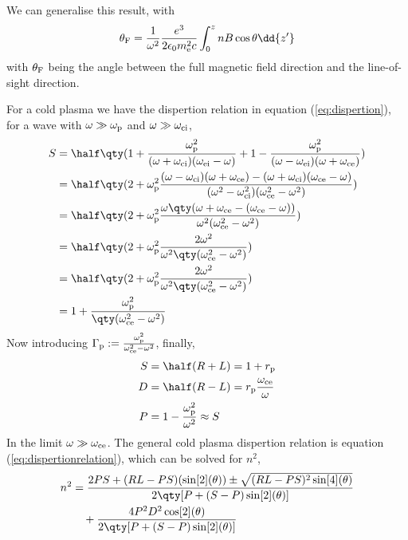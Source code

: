 \documentclass{book}         		                %
\begin{document}
We can generalise this result, with
\begin{equation}
  \label{eq:faradayangle}
  \theta_{\rm F} = \frac{1}{\omega^2} \frac{e^3}{2 \epsilon_0 m_{\rm e}^2 c} \int_0^z n B \cos \theta \dd{z'}
\end{equation}
with $\theta_{\rm F}$ being the angle between the full magnetic field
direction and the line-of-sight direction.

For a cold plasma we have the dispertion relation in equation
(\ref{eq:dispertion}), for a wave with $\omega \gg \omega_{\rm p}$ and
$\omega \gg \omega_{\rm ci}$,
\begin{align*}
  S &= \half \qty( 1 + \frac{\omega_{\rm p}^2}{(\omega + \omega_{\rm ci})(\omega_{\rm ei}-\omega)} + 1 - \frac{\omega_{\rm p}^2}{(\omega - \omega_{\rm ei})(\omega+\omega_{\rm ce})}) \\
&= \half \qty( 2+ \omega_{\rm p}^2 \frac{(\omega-\omega_{\rm ci})(\omega+\omega_{\rm ce}) - (\omega+\omega_{\rm ci})(\omega_{\rm ce}-\omega)}{(\omega^2-\omega_{\rm ci}^2)(\omega_{\rm ce}^2 - \omega^2)}) \\
&= \half \qty( 2+ \omega_{\rm p}^2  \frac{\omega \qty(\omega+\omega_{\rm ce} - (\omega_{\rm ce}-\omega))}{\omega^2(\omega_{\rm ce}^2 - \omega^2)})\\
&= \half \qty( 2+ \omega_{\rm p}^2 \frac{2 \omega^2}{\omega^2 \qty(\omega_{\rm ce}^2 - \omega^2)} )\\
&= \half \qty( 2+ \omega_{\rm p}^2 \frac{2 \omega^2}{\omega^2 \qty(\omega^2_{\rm ce} - \omega^2)}) \\
&= 1 + \frac{\omega_{\rm p}^2}{\qty( \omega_{\rm ce}^2 - \omega^2)}
\end{align*}
Now introducing $\Gamma_{\rm p} := \frac{\omega_{\rm
    p}^2}{\omega^2_{\rm ce} - \omega^2}$,
finally,
\begin{align*}
  S &= \half (R+L) = 1+r_{\rm p}\\
D &= \half (R-L) = r_{\rm p} \frac{\omega_{\rm ce}}{\omega}\\
P &= 1 - \frac{\omega_{\rm p}^2}{\omega^2} \approx S
\end{align*}
In the limit $\omega \gg \omega_{\rm ce}$.  The general cold plasma
dispertion relation is equation (\ref{eq:dispertionrelation}), which
can be solved for $n^2$,
\begin{align*} 
n^2 &= \frac{2 PS +(RL-PS)(\sin[2](\theta)) \pm \sqrt{(RL-PS)^2 \sin[4](\theta)} }{{2 \qty[ P+(S-P) \sin[2](\theta)]}} \\& \quad+ \frac{{4 P^2D^2 \cos[2](\theta)}}{2 \qty[ P+(S-P) \sin[2](\theta)]} 
\end{align*}
\end{document}
